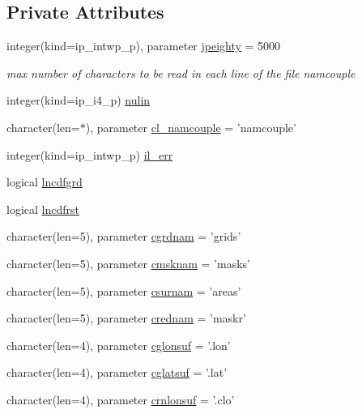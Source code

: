 \subsection*{Private Attributes}
\begin{DoxyCompactItemize}
\item 
integer(kind=ip\+\_\+intwp\+\_\+p), parameter \hyperlink{classmod__oasis__namcouple_a4fb10ad6e864dcbe34c4a8b02204a523}{jpeighty} = 5000
\begin{DoxyCompactList}\small\item\em max number of characters to be read in each line of the file namcouple \end{DoxyCompactList}\item 
integer(kind=ip\+\_\+i4\+\_\+p) \hyperlink{classmod__oasis__namcouple_a36ef9483c332254e38c52b1d78d26f1f}{nulin}
\item 
character(len=$\ast$), parameter \hyperlink{classmod__oasis__namcouple_ae023a43e29bb32ebf11f193e34d8bd85}{cl\+\_\+namcouple} = 'namcouple'
\item 
integer(kind=ip\+\_\+intwp\+\_\+p) \hyperlink{classmod__oasis__namcouple_a18b7a14f095f3cb6ace40afc06e2a5b9}{il\+\_\+err}
\item 
logical \hyperlink{classmod__oasis__namcouple_a5d6add8b958acc8b865b898d9e54ac73}{lncdfgrd}
\item 
logical \hyperlink{classmod__oasis__namcouple_a645168dae20a0c24786c3e6dcea9f2ab}{lncdfrst}
\item 
character(len=5), parameter \hyperlink{classmod__oasis__namcouple_afaa0549951c43335a2f8e75c7b1d2846}{cgrdnam} = 'grids'
\item 
character(len=5), parameter \hyperlink{classmod__oasis__namcouple_aeeda85bec8a449e87411d4ed404322c5}{cmsknam} = 'masks'
\item 
character(len=5), parameter \hyperlink{classmod__oasis__namcouple_a49e79935fc2421fe3e4e7422f17b34ea}{csurnam} = 'areas'
\item 
character(len=5), parameter \hyperlink{classmod__oasis__namcouple_a161fc23acf442c75c9d6ba7758937d59}{crednam} = 'maskr'
\item 
character(len=4), parameter \hyperlink{classmod__oasis__namcouple_ac1a557cecb41295e7d5cb004a7937ea4}{cglonsuf} = '.lon'
\item 
character(len=4), parameter \hyperlink{classmod__oasis__namcouple_a2036218f05c62fc672bd07ece34f26db}{cglatsuf} = '.lat'
\item 
character(len=4), parameter \hyperlink{classmod__oasis__namcouple_ae56f031c6d9a819a39fe5170f42d7ce1}{crnlonsuf} = '.clo'

\end{DoxyCompactItemize}
